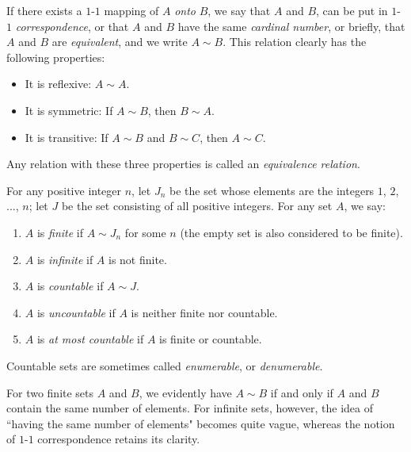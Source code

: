 \begin{definition}
    If there exists a \(1\)-\(1\) mapping of \(A\) \emph{onto} \(B\), we say that \(A\) and \(B\), can be put in \(1\)-\(1\) \emph{correspondence}, or that \(A\) and \(B\) have the same \emph{cardinal number}, or briefly, that \(A\) and \(B\) are \emph{equivalent}, and we write \(A\sim B\). This relation clearly has the following properties:
    \begin{itemize}
        \item It is reflexive: \(A\sim A\).
        \item It is symmetric: If \(A\sim B\), then \(B\sim A\).
        \item It is transitive: If \(A\sim B\) and \(B\sim C\), then \(A\sim C\).
    \end{itemize}
    Any relation with these three properties is called an \emph{equivalence relation}.
\end{definition}

\begin{definition}\label{definition:2.4}
    For any positive integer \(n\), let \(J_n\) be the set whose elements are the integers \(1\), \(2\), \(\ldots\), \(n\); let \(J\) be the set consisting of all positive integers. For any set \(A\), we say:
    \begin{enumerate}
        \item \(A\) is \emph{finite} if \(A\sim J_n\) for some \(n\) (the empty set is also considered to be finite).
        \item\label{itm:2.1.5} \(A\) is \emph{infinite} if \(A\) is not finite.
        \item \(A\) is \emph{countable} if \(A\sim J\).
        \item \(A\) is \emph{uncountable} if \(A\) is neither finite nor countable.
        \item \(A\) is \emph{at most countable} if \(A\) is finite or countable.
    \end{enumerate}
\end{definition}

Countable sets are sometimes called \emph{enumerable}, or \emph{denumerable}.

For two finite sets \(A\) and \(B\), we evidently have \(A\sim B\) if and only if \(A\) and \(B\) contain the same number of elements. For infinite sets, however, the idea of ``having the same number of elements" becomes quite vague, whereas the notion of \(1\)-\(1\) correspondence retains its clarity.

